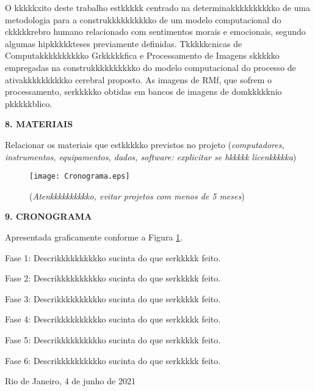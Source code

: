 \documentclass[a4paper,12pt,oneside,openany]{report}
\begin{document}
O kkkkkxito deste trabalho estkkkkk centrado na determinakkkkkkkkkko de uma metodologia para a construkkkkkkkkkko de um modelo computacional do ckkkkkrebro humano relacionado com sentimentos morais e emocionais, segundo algumas hipkkkkkteses previamente definidas. Tkkkkkcnicas de Computakkkkkkkkkko Grkkkkkfica e Processamento de Imagens skkkkko empregadas na construkkkkkkkkkko do modelo computacional \cite{Lins98} do processo de ativakkkkkkkkkko cerebral proposto. As imagens de RMf, que sofrem o processamento, serkkkkko obtidas em bancos de imagens de domkkkkknio pkkkkkblico.

\vspace{0.4cm}
\textbf{8. MATERIAIS}
	
Relacionar os materiais que estkkkkko previstos no projeto (\textit{computadores, instrumentos, equipamentos, dados, software: explicitar se hkkkkk licenkkkkka})

\begin{figure}
      \begin{center}
      \parbox[h]{14cm}
        {
        \begin{center}
        \texttt{[image: Cronograma.eps]}
        \caption[\small{(\textit{Atenkkkkkkkkkko, evitar projetos com menos de 5 meses})}]{\label{Fig:Cronograma} \footnotesize{(\textit{Atenkkkkkkkkkko, evitar projetos com menos de 5 meses})}}
        \end{center}
        }
      \end{center}
\end{figure} 

\vspace{0.4cm}
\textbf{9. CRONOGRAMA}

Apresentada graficamente conforme a Figura \ref{Fig:Cronograma}.

Fase 1: Descrikkkkkkkkkko sucinta do que serkkkkk feito.

Fase 2: Descrikkkkkkkkkko sucinta do que serkkkkk feito.

Fase 3: Descrikkkkkkkkkko sucinta do que serkkkkk feito.

Fase 4: Descrikkkkkkkkkko sucinta do que serkkkkk feito.

Fase 5: Descrikkkkkkkkkko sucinta do que serkkkkk feito.

Fase 6: Descrikkkkkkkkkko sucinta do que serkkkkk feito.



 


\vspace{2cm}
\noindent
Rio de Janeiro, 4 de junho de 2021
\end{document}
